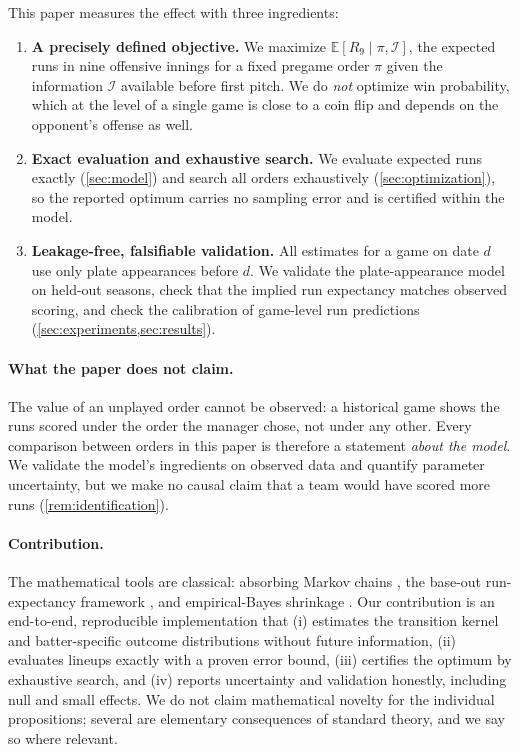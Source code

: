 \documentclass[11pt]{article}
\theoremstyle{definition}
\theoremstyle{remark}
\newcommand{\E}{\mathbb{E}}
\newcommand{\cI}{\mathcal{I}}
\begin{document}
This paper measures the effect with three ingredients:
\begin{enumerate}[leftmargin=*]
\item \textbf{A precisely defined objective.} We maximize $\E[R_9\mid\pi,\cI]$, the expected runs
in nine offensive innings for a fixed pregame order $\pi$ given the information $\cI$ available
before first pitch. We do \emph{not} optimize win probability, which at the level of a single game
is close to a coin flip and depends on the opponent's offense as well.
\item \textbf{Exact evaluation and exhaustive search.} We evaluate expected runs exactly
(\cref{sec:model}) and search all orders exhaustively (\cref{sec:optimization}), so the reported
optimum carries no sampling error and is certified within the model.
\item \textbf{Leakage-free, falsifiable validation.} All estimates for a game on date $d$ use only
plate appearances before $d$. We validate the plate-appearance model on held-out seasons, check
that the implied run expectancy matches observed scoring, and check the calibration of game-level
run predictions (\cref{sec:experiments,sec:results}).
\end{enumerate}

\paragraph{What the paper does not claim.} The value of an unplayed order cannot be observed:
a historical game shows the runs scored under the order the manager chose, not under any other.
Every comparison between orders in this paper is therefore a statement \emph{about the model}.
We validate the model's ingredients on observed data and quantify parameter uncertainty, but we
make no causal claim that a team would have scored more runs (\cref{rem:identification}).

\paragraph{Contribution.} The mathematical tools are classical: absorbing Markov chains
\cite{kemeny1960}, the base-out run-expectancy framework \cite{lindsey1963,tango2007}, and
empirical-Bayes shrinkage \cite{efron1975,brown2008}. Our contribution is an end-to-end,
reproducible implementation that (i) estimates the transition kernel and batter-specific outcome
distributions without future information, (ii) evaluates lineups exactly with a proven error
bound, (iii) certifies the optimum by exhaustive search, and (iv) reports uncertainty and
validation honestly, including null and small effects. We do not claim mathematical novelty for
the individual propositions; several are elementary consequences of standard theory, and we say
so where relevant.
\end{document}
